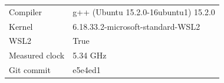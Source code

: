 \small
\begin{tabular}{l p{9cm}}
\hline
Compiler & g++ (Ubuntu 15.2.0-16ubuntu1) 15.2.0 \\
Kernel & 6.18.33.2-microsoft-standard-WSL2 \\
WSL2 & True \\
Measured clock & 5.34 GHz \\
Git commit & e5e4ed1 \\
\hline
\end{tabular}
